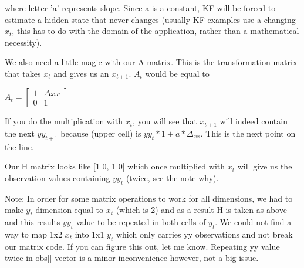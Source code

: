 \documentclass[12pt,fleqn]{article}
\begin{document}
where letter 'a' represents slope. Since a is a constant, KF will be forced
to estimate a hidden state that never changes (usually KF examples use a
changing $x_t$, this has to do with the domain of the application, rather
than a mathematical necessity).

We also need a little magic with our A matrix. This is the transformation
matrix that takes $x_t$ and gives us an $x_{t+1}$. $A_t$ would be equal to 

$A_t = 
\left[
\begin{array}{cc}
1 & \Delta xx\\
 0 & 1
\end{array}
\right]
$

If you do the multiplication with $x_t$, you will see that $x_{t+1}$ will
indeed contain the next $yy_{t+1}$ because (upper cell) is $yy_t*1 +
a*\Delta_{xx}$. This is the next point on the line.

Our H matrix looks like [1 0, 1 0] which once multiplied with $x_t$ will give
us the observation values containing $yy_t$ (twice, see the note why).

Note: In order for some matrix operations to work for all dimensions, we
had to make $y_t$ dimension equal to $x_t$ (which is 2) and as a result H is
taken as above and this results $yy_t$ value to be repeated in both cells of
$y_t$. We could not find a way to map 1x2 $x_t$ into 1x1 $y_t$ which only carries
yy observations and not break our matrix code. If you can figure this out,
let me know. Repeating yy value twice in obs[] vector is a minor
inconvenience however, not a big issue.
\end{document}

